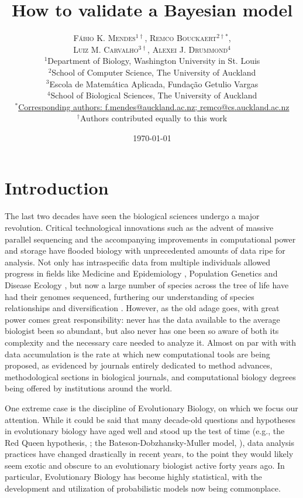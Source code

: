\documentclass[oneside]{article}
\title{How to validate a Bayesian model} %
\author{\textsc{F\'{a}bio K. Mendes$^{1\dagger}$}, \textsc{Remco Bouckaert$^{2\dagger*}$},\\
\textsc{Luiz M. Carvalho$^{3\dagger}$}, \textsc{Alexei J. Drummond$^{4}$} \\
\small $^1$Department of Biology, Washington University in St. Louis\\
\small $^2$School of Computer Science, The University of Auckland\\
\small $^3$Escola de Matem\'{a}tica Aplicada, Fundaç\~{a}o Getulio Vargas\\
\small $^4$School of Biological Sciences, The University of Auckland\\
\small
\href{mailto:f.mendes@auckland.ac.nz}{$^*$Corresponding authors:
  f.mendes@auckland.ac.nz; remco@cs.auckland.ac.nz}\\
{\small $^\dagger$Authors contributed equally to this work}
}
\date{\today} %
\begin{document}
\maketitle


\section*{Introduction}
The last two decades have seen the biological sciences undergo a major revolution.
Critical technological innovations such as the advent of massive parallel sequencing and the accompanying improvements in computational power and storage have flooded biology with unprecedented amounts of data ripe for analysis.
Not only has intraspecific data from multiple individuals allowed progress in fields like Medicine and Epidemiology
\citep[e.g.,][]{1000g,humanmicrobiome,neafsey15}, Population Genetics \citep[e.g.,][]{lynch07,lack16,demanuel16} and Disease Ecology \citep[e.g.,][]{rosenblum13,bates18}, but now a large number of species across the tree of life have had their genomes sequenced, furthering our understanding of species relationships and diversification \citep[e.g.,][]{martin13,brawand14,jarvis14,novikova16,pease2016,kawahara19,upham19}.
However, as the old adage goes, with great power comes great responsibility: never has the data available to the average biologist been so abundant, but also never has one been so aware of both its complexity and the necessary care needed to analyze it. 
Almost on par with with data accumulation is the rate at which new computational tools are being proposed, as evidenced by journals entirely dedicated to method advances, methodological sections in biological journals, and computational biology degrees being offered by institutions around the world.

One extreme case is the discipline of Evolutionary Biology, on which we focus our attention.
While it could be said that many decade-old questions and hypotheses in evolutionary biology have aged well and stood up the test of time (e.g., the Red Queen hypothesis, \citealt{vanvalen73,lively87,morran11,gibson15}; the Bateson-Dobzhansky-Muller model, \citealt{dob36,muller40,hopkins12,roda17}), data analysis practices have changed drastically in recent years, to the point they would likely seem exotic and obscure to an evolutionary biologist active forty years ago. 
In particular, Evolutionary Biology has become highly statistical, with the development and utilization of probabilistic models now being commonplace.
\end{document}
